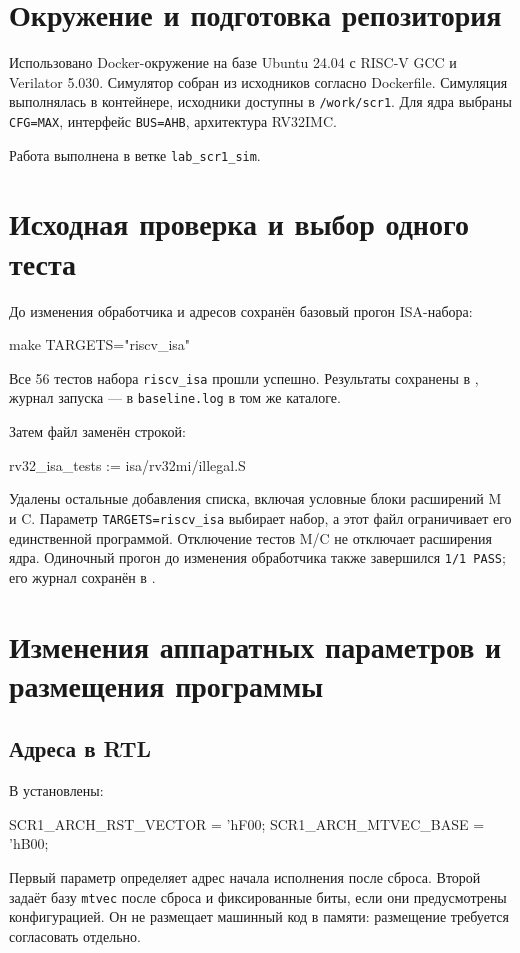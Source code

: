 \documentclass[12pt,a4paper]{article}
\begin{document}
\section{Окружение и подготовка репозитория}
Использовано Docker-окружение на базе Ubuntu 24.04 с RISC-V GCC и
Verilator 5.030. Симулятор собран из исходников согласно Dockerfile.
Симуляция выполнялась в контейнере, исходники доступны в
\texttt{/work/scr1}. Для ядра выбраны \texttt{CFG=MAX}, интерфейс
\texttt{BUS=AHB}, архитектура RV32IMC.

Работа выполнена в ветке \texttt{lab\_scr1\_sim}.

\section{Исходная проверка и выбор одного теста}
До изменения обработчика и адресов сохранён базовый прогон ISA-набора:
\begin{Code}
make TARGETS="riscv_isa"
\end{Code}
Все 56 тестов набора \texttt{riscv\_isa} прошли успешно.
Результаты сохранены в ,
журнал запуска --- в \texttt{baseline.log} в том же каталоге.

Затем файл  заменён строкой:
\begin{Code}
rv32_isa_tests := isa/rv32mi/illegal.S
\end{Code}
Удалены остальные добавления списка, включая условные блоки расширений M и C.
Параметр \texttt{TARGETS=riscv\_isa} выбирает набор, а этот файл ограничивает
его единственной программой. Отключение тестов M/C не отключает расширения ядра.
Одиночный прогон до изменения обработчика также завершился \texttt{1/1 PASS};
его журнал сохранён в .

\section{Изменения аппаратных параметров и размещения программы}

\subsection{Адреса в RTL}
В  установлены:
\begin{Code}
SCR1_ARCH_RST_VECTOR = 'hF00;
SCR1_ARCH_MTVEC_BASE = 'hB00;
\end{Code}
Первый параметр определяет адрес начала исполнения после сброса.
Второй задаёт базу \texttt{mtvec} после сброса и фиксированные биты,
если они предусмотрены конфигурацией. Он не размещает машинный код
в памяти: размещение требуется согласовать отдельно.
\end{document}
